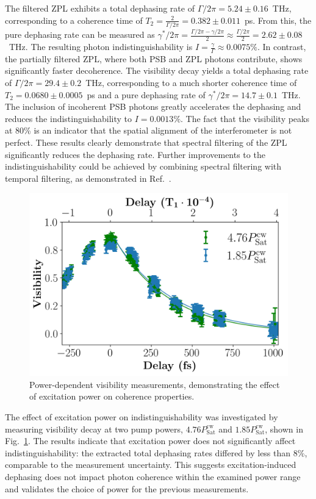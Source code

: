 The filtered ZPL exhibits a total dephasing rate of $\Gamma/2\pi = 5.24 \pm 0.16$~THz, corresponding to a coherence time of $T_2 = \frac{2}{\Gamma/2\pi} = 0.382 \pm 0.011$~ps. From this, the pure dephasing rate can be measured as $\gamma^*/2\pi = \frac{\Gamma/2\pi - \gamma/2\pi}{2} \approx \frac{\Gamma/2\pi}{2} = 2.62 \pm 0.08$~THz. The resulting photon indistinguishability is $I = \frac{\gamma}{\Gamma} \approx 0.0075\%$. In contrast, the partially filtered ZPL, where both PSB and ZPL photons contribute, shows significantly faster decoherence. The visibility decay yields a total dephasing rate of $\Gamma/2\pi = 29.4 \pm 0.2$~THz, corresponding to a much shorter coherence time of $T_2 = 0.0680 \pm 0.0005$~ps and a pure dephasing rate of $\gamma^*/2\pi = 14.7 \pm 0.1$~THz. The inclusion of incoherent PSB photons greatly accelerates the dephasing and reduces the indistinguishability to $I = 0.0013\%$. The fact that the visibility peaks at 80\% is an indicator that the spatial alignment of the interferometer is not perfect. These results clearly demonstrate that spectral filtering of the ZPL significantly reduces the dephasing rate. Further improvements to the indistinguishability could be achieved by combining spectral filtering with temporal filtering, as demonstrated in Ref.~\cite{Fournier2023}.

\begin{figure}[h!]
        \centering
            \includegraphics[width=0.8\linewidth]{Figures/PowerVis.png}
        \caption{Power-dependent visibility measurements, demonstrating the effect of excitation power on coherence properties.}
        \label{fig:power-vis}
\end{figure}


The effect of excitation power on indistinguishability was investigated by measuring visibility decay at two pump powers, $4.76P_{\text{Sat}}^{\text{cw}}$ and $1.85P_{\text{Sat}}^{\text{cw}}$, shown in Fig.~\ref{fig:power-vis}. The results indicate that excitation power does not significantly affect indistinguishability: the extracted total dephasing rates differed by less than 8\%, comparable to the measurement uncertainty. This suggests excitation-induced dephasing does not impact photon coherence within the examined power range and validates the choice of power for the previous measurements.


